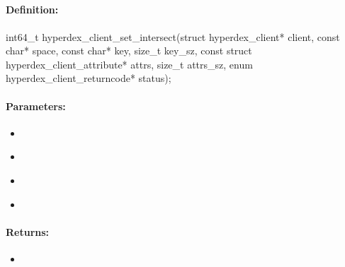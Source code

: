 \pagebreak
\subsection{}
\label{api:c:set_intersect}


\paragraph{Definition:}
\begin{ccode}
int64_t hyperdex_client_set_intersect(struct hyperdex_client* client,
        const char* space,
        const char* key, size_t key_sz,
        const struct hyperdex_client_attribute* attrs, size_t attrs_sz,
        enum hyperdex_client_returncode* status);
\end{ccode}

\paragraph{Parameters:}
\begin{itemize}[noitemsep]
\item {}\\

\item {}\\

\item {}\\

\item {}\\

\end{itemize}

\paragraph{Returns:}
\begin{itemize}[noitemsep]
\item {}\\

\end{itemize}

